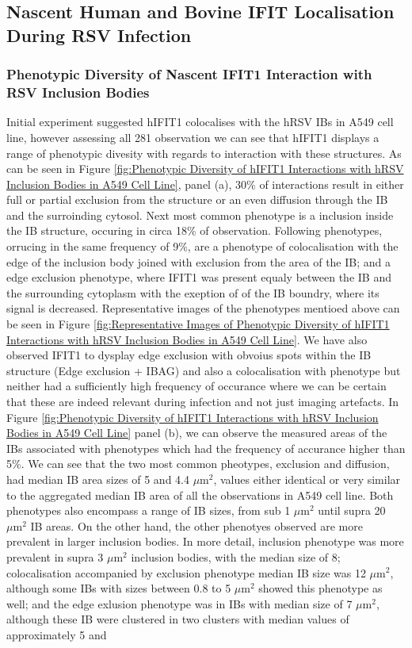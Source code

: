 \subsection{Nascent Human and Bovine IFIT Localisation During RSV Infection} \label{subsec:Nascent Human and Bovine IFIT Localisation During RSV Infection}
\subsubsection{Phenotypic Diversity of Nascent IFIT1 Interaction with RSV Inclusion Bodies}
Initial experiment suggested hIFIT1 colocalises with the hRSV IBs in A549 cell line, however assessing all 281 observation we can see that hIFIT1 displays a range of phenotypic divesity with regards to interaction with these structures. As can be seen in Figure \ref{fig:Phenotypic Diversity of hIFIT1 Interactions with hRSV Inclusion Bodies in A549 Cell Line}, panel (a), 30\% of interactions result in either full or partial exclusion from the structure or an even diffusion through the IB and the surroinding cytosol. Next most common phenotype is a inclusion inside the IB structure, occuring in circa 18\% of observation. Following phenotypes, orrucing in the same frequency of 9\%, are a phenotype of colocalisation with the edge of the inclusion body joined with exclusion from the area of the IB; and a edge exclusion phenotype, where IFIT1 was present equaly between the IB and the surrounding cytoplasm with the exeption of of the IB boundry, where its signal is decreased. Representative images of the phenotypes mentioed above can be seen in Figure \ref{fig:Representative Images of Phenotypic Diversity of hIFIT1 Interactions with hRSV Inclusion Bodies in A549 Cell Line}. We have also observed IFIT1 to dysplay edge exclusion with obvoius spots within the IB structure (Edge exclusion + IBAG) and also a colocalisation with phenotype but neither had a sufficiently high frequency of occurance where we can be certain that these are indeed relevant during infection and not just imaging artefacts. In Figure \ref{fig:Phenotypic Diversity of hIFIT1 Interactions with hRSV Inclusion Bodies in A549 Cell Line} panel (b), we can observe the measured areas of the IBs associated with phenotypes which had the frequency of accurance higher than 5\%. We can see that the two most common pheotypes, exclusion and diffusion, had median IB area sizes of 5 and 4.4 \(\mu \mbox{m}^2\), values either identical or very similar to the aggregated median IB area of all the observations in A549 cell line. Both phenotypes also encompass a range of IB sizes, from sub 1 \(\mu \mbox{m}^2\) until supra 20 \(\mu \mbox{m}^2\) IB areas. On the other hand, the other phenotyes observed are more prevalent in larger inclusion bodies. In more detail, inclusion phenotype was more prevalent in supra 3 \(\mu \mbox{m}^2\) inclusion bodies, with the median size of 8; colocalisation accompanied by exclusion phenotype median IB size was 12 \(\mu \mbox{m}^2\), although some IBs with sizes between 0.8 to 5 \(\mu \mbox{m}^2\) showed this phenotype as well; and the edge exlusion phenotype was in IBs with median size of 7 \(\mu \mbox{m}^2\), although these IB were clustered in two clusters with median values of approximately 5 and 